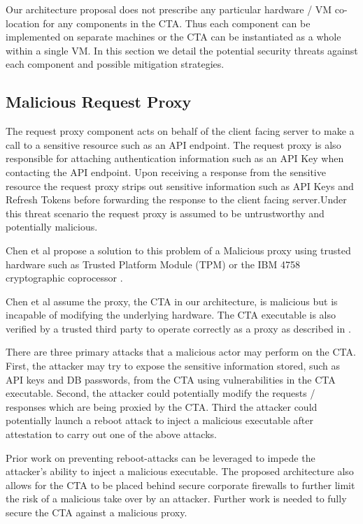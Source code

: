 \documentclass{sig-alternate-05-2015}
\begin{document}
Our architecture proposal does not prescribe any particular hardware / VM co-location for any components in the CTA. Thus each component can be implemented on separate machines or the CTA can be instantiated as a whole within a single VM. In this section we detail the potential security threats against each component and possible mitigation strategies.

\subsection*{Malicious Request Proxy}

The request proxy component acts on behalf of the client facing server to make a call to a sensitive resource such as an API endpoint. The request proxy is also responsible for attaching authentication information such as an API Key when contacting the API endpoint. Upon receiving a response from the sensitive resource the request proxy strips out sensitive information such as API Keys and Refresh Tokens before forwarding the response to the client facing server.Under this threat scenario the request proxy is assumed to be untrustworthy and potentially malicious.

Chen et al \cite{chen_towards_2012} propose a solution to this problem of a Malicious proxy using trusted hardware such as Trusted Platform Module (TPM) or the IBM 4758 cryptographic coprocessor \cite{parno_bootstrapping_2010}. 

Chen et al assume the proxy, the CTA in our architecture, is malicious but is incapable of modifying the underlying hardware. The CTA executable is also verified by a trusted third party to operate correctly as a proxy as described in \cite{parno_bootstrapping_2010}.

There are three primary attacks that a malicious actor may perform on the CTA. First, the attacker may try to expose the sensitive information stored, such as API keys and DB passwords, from the CTA using vulnerabilities in the CTA executable. Second, the attacker could potentially modify the requests / responses which are being proxied by the CTA. Third the attacker could potentially launch a reboot attack to inject a malicious executable after attestation to carry out one of the above attacks.

Prior work \cite{libert_tracing_2008, mccune_flicker:_2008} on preventing reboot-attacks can be leveraged to impede the attacker's ability to inject a malicious executable. The proposed architecture also allows for the CTA to be placed behind secure corporate firewalls to further limit the risk of a malicious take over by an attacker. Further work is needed to fully secure the CTA against a malicious proxy.
\end{document}
